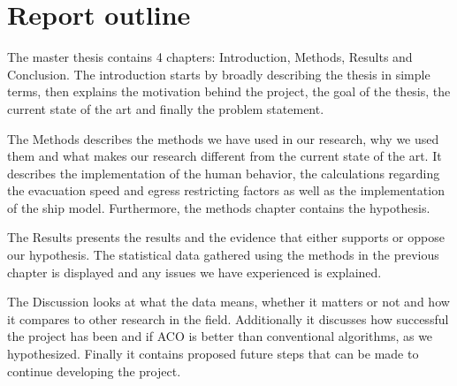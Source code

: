 
\section{Report outline}

The master thesis contains 4 chapters: Introduction, Methods, Results and Conclusion.               
The introduction starts by broadly describing the thesis in simple terms, then explains the motivation behind the project,
the goal of the thesis, the current state of the art and finally the problem statement. 

The Methods describes the methods we have used in our research, why we used them and what makes
our research different from the current state of the art. It describes the implementation of the human behavior,
the calculations regarding the evacuation speed and egress restricting factors as well as the implementation of the 
ship model. Furthermore, the methods chapter contains the hypothesis.

The Results presents the results and the evidence that either supports or oppose our hypothesis. The
statistical data gathered using the methods in the previous chapter is displayed and any issues we have experienced
is explained.

The Discussion looks at what the data means, whether it matters or not and how it compares to other research in the field.
Additionally it discusses how successful the project has been and if ACO is better than conventional algorithms, as we hypothesized.
Finally it contains proposed future steps that can be made to continue developing the project.
